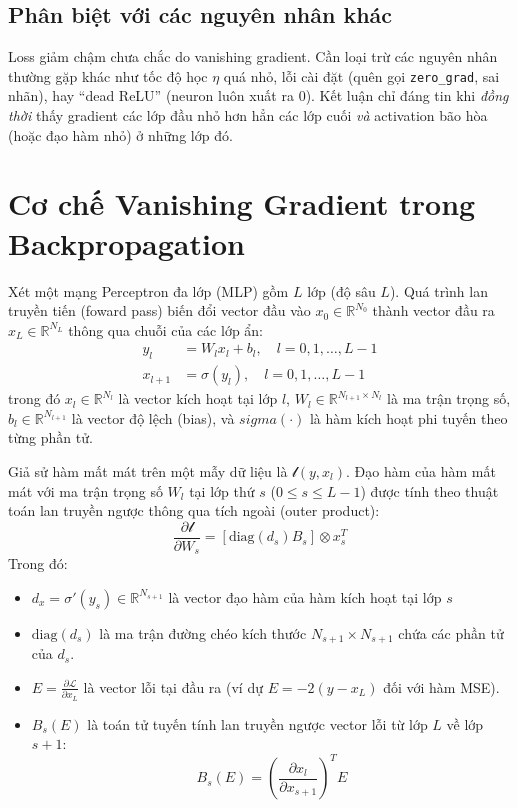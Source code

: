 \documentclass[12pt]{article}
\begin{document}
\subsection{Phân biệt với các nguyên nhân khác}
Loss giảm chậm chưa chắc do vanishing gradient. Cần loại trừ các nguyên nhân thường gặp khác như tốc độ học $\eta$ quá nhỏ, lỗi cài đặt (quên gọi \texttt{zero\_grad}, sai nhãn), hay ``dead ReLU'' (neuron luôn xuất ra $0$). Kết luận chỉ đáng tin khi \emph{đồng thời} thấy gradient các lớp đầu nhỏ hơn hẳn các lớp cuối \emph{và} activation bão hòa (hoặc đạo hàm nhỏ) ở những lớp đó.

\section{Cơ chế Vanishing Gradient trong Backpropagation}
Xét một mạng Perceptron đa lớp (MLP) gồm $L$ lớp (độ sâu $L$). Quá trình lan truyền tiến (foward pass) biến đổi vector đầu vào $x_0 \in \mathbb{R}^{N_0}$ thành vector đầu ra $x_L \in \mathbb{R}^{N_L}$ thông qua chuỗi của các lớp ẩn:
\begin{align}
    y_l &= W_l x_l + b_l, \quad l = 0, 1, \dots, L-1 \\
    x_{l+1} &= \sigma(y_l), \quad l = 0, 1, \dots, L-1
\end{align}
trong đó $x_l \in \mathbb{R}^{N_l}$ là vector kích hoạt tại lớp $l$, $W_l \in \mathbb{R}^{N_{l+1} \times N_l}$ là ma trận trọng số, $b_l \in \mathbb{R}^{N_{l+1}}$ là vector độ lệch (bias), và $sigma(\cdot)$ là hàm kích hoạt phi tuyến theo từng phần tử.

Giả sử hàm mất mát trên một mẫy dữ liệu là $\mathcal{l}(y, x_l)$. Đạo hàm của hàm mất mát với ma trận trọng số $W_l$ tại lớp thứ $s$ ($0 \le s \le L-1$) được tính theo thuật toán lan truyền ngược thông qua tích ngoài (outer product):
\begin{equation}
    \frac{\partial \mathcal{l}}{\partial W_s} = \left[ \text{diag}(d_s) B_s \right] \otimes x_s^T
\end{equation}
Trong đó:
\begin{itemize}
    \item $d_x = \sigma'(y_s) \in \mathbb{R}^{N_{s+1}}$ là vector đạo hàm của hàm kích hoạt tại lớp $s$
    \item $\text {diag}(d_s)$ là ma trận đường chéo kích thước $N_{s+1} \times N_{s+1}$ chứa các phần tử của $d_s$.
    \item $E = \frac{\partial \mathcal{L}}{\partial x_L}$ là vector lỗi tại đầu ra (ví dự $E = -2(y - x_L)$ đối với hàm MSE).
    \item $B_s(E)$ là toán tử tuyến tính lan truyền ngược vector lỗi từ lớp $L$ về lớp $s+1$:
    \begin{equation}
        B_s(E)= \left( \frac{\partial x_l}{\partial x_{s+1}} \right)^T E
    \end{equation}
\end{itemize}
\end{document}
